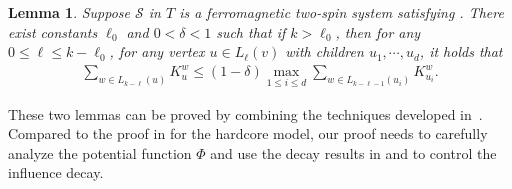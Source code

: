 \documentclass[11pt]{amsart}
\def\+#1{\mathcal{#1}}
\newcommand{\abs}[1]{\ensuremath{\left\vert#1\right\vert}}
\newtheorem{lemma}[theorem]{Lemma}
\theoremstyle{definition}
\theoremstyle{remark}
\begin{document}


\begin{lemma}\label{lemma:general-influence-decay-2}
Suppose $\+S$ in $T$ is a ferromagnetic two-spin system satisfying .
There exist constants $\ell_0$ and $0< \delta < 1$ such that if $k > \ell_0$, then for any $0 \leq \ell \leq k - \ell_0$, for any vertex $u \in L_\ell(v)$ with children $u_1,\cdots,u_d$, it holds that 
\begin{align*}
  \sum_{w \in L_{k-\ell}(u)} K_u^w \leq (1 - \delta) \max_{1 \leq i \leq d} \sum_{w \in L_{k-\ell-1}(u_i)} K_{u_i}^w.
\end{align*}
\end{lemma}

These two lemmas can be proved by combining the techniques developed in~\cite{GuoL18,ALO24}. Compared to the proof in \cite{ALO24} for the hardcore model, our proof needs to carefully analyze the potential function $\Phi$ and use the decay results in  and  to control the influence decay.
\end{document}
